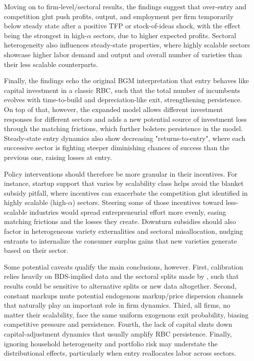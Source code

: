 \documentclass[a4paper,12pt]{article} %
\numberwithin{equation}{section} %
\numberwithin{figure}{section}
\numberwithin{table}{section}
\begin{document}
Moving on to firm-level/sectoral results, the findings suggest that over-entry and competition glut push profits, output, and employment per firm 
temporarily below steady state after a positive TFP or stock-of-ideas shock, with the effect being the strongest in high-$\alpha$ sectors, due to higher
expected profits. Sectoral heterogeneity also influences steady-state properties, where highly scalable sectors showcase higher labor demand and output 
and overall number of varieties than their less scalable counterparts.

Finally, the findings echo the original BGM interpretation that entry behaves like capital investment in a classic RBC, such that the total number of
incumbents evolves with time-to-build and depreciation-like exit, strengthening persistence. On top of that, however, the expanded model allows 
different investment responses for different sectors and adds a new potential source of investment loss through the matching frictions, 
which further bolsters persistence in the model. Steady-state entry dynamics also show decreasing "returns-to-entry", where each successive sector is 
fighting steeper diminishing chances of success than the previous one, raising losses at entry.

Policy interventions should therefore be more granular in their incentives. For instance, startup support that varies by scalability class helps avoid 
the blanket subsidy pitfall, where incentives can exacerbate the competition glut identified in highly scalable (high-$\alpha$) sectors. 
Steering some of those incentives toward less-scalable industries would spread entrepreneurial effort more evenly, easing matching 
frictions and the losses they create. Downturn subsidies should also factor in heterogeneous variety externalities and sectoral misallocation, 
nudging entrants to internalize the consumer surplus gains that new varieties generate based on their sector.

Some potential caveats qualify the main conclusions, however. First, calibration relies heavily on BDS-implied data and the sectoral splits made by 
\textcite{sedlavcek2017growth}, such that results could be sensitive to alternative splits or new data altogether. Second, constant markups mute 
potential endogenous markup/price dispersion channels that naturally play an important role in firm dynamics. Third, all firms, no matter their scalability,
face the same uniform exogenous exit probability, biasing competitive pressure and persistence. Fourth, the lack of capital shuts down capital-adjustment
dynamics that usually amplify RBC persistence. Finally, ignoring household heterogeneity and portfolio risk may understate the distributional
effects, particularly when entry reallocates labor across sectors.
\end{document}
